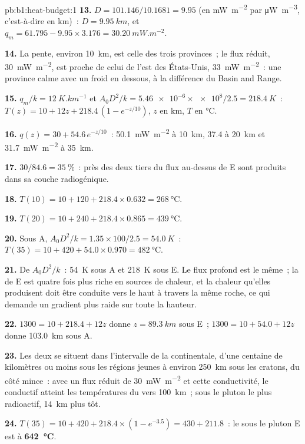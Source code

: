 \begin{solution}{pb:b1:heat-budget:1}
\textbf{13.} $D = 101.146/10.1681 = 9.95$ (en \unit{mW.m^{-2}} par
\unit{\micro W.m^{-3}}, c'est-à-dire en km)~: $D = \qty{9.95}{km}$, et $q_m = 61.795 -
9.95\times3.176 = \qty{30.20}{mW.m^{-2}}$.

\textbf{14.} La pente, environ \qty{10}{km}, est celle des trois provinces~; le
flux réduit, \qty{30}{mW.m^{-2}}, est proche de celui de l'est des États-Unis,
\qty{33}{mW.m^{-2}}~: une province calme avec un  froid en dessous, à la
différence du Basin and Range.

\textbf{15.} $q_m/k = \qty{12}{K.km^{-1}}$ et $A_0D^2/k = \num{5.46e-6}\times\num{e8}/2.5
= \qty{218.4}{K}$~: $T(z) = 10 + 12z + 218.4\,(1 - e^{-z/10})$, $z$ en km, $T$ en
\unit{\degreeCelsius}.

\textbf{16.} $q(z) = 30 + 54.6\,e^{-z/10}$~: \qty{50.1}{mW.m^{-2}} à \qty{10}{km},
\num{37.4} à \qty{20}{km} et \qty{31.7}{mW.m^{-2}} à \qty{35}{km}.

\textbf{17.} $30/84.6 = \qty{35}{\percent}$~: près des deux tiers du flux
au-dessus de E sont produits dans sa couche radiogénique.

\textbf{18.} $T(10) = 10 + 120 + 218.4\times0.632 = \qty{268}{\degreeCelsius}$.

\textbf{19.} $T(20) = 10 + 240 + 218.4\times0.865 = \qty{439}{\degreeCelsius}$.

\textbf{20.} Sous A, $A_0D^2/k = 1.35\times100/2.5 = \qty{54.0}{K}$~:
$T(35) = 10 + 420 + 54.0\times0.970 = \qty{482}{\degreeCelsius}$.

\textbf{21.} De $A_0D^2/k$~: \qty{54}{K} sous A et \qty{218}{K} sous E. Le flux
profond est le même~; la  de E est quatre fois plus riche en sources de chaleur, et la
chaleur qu'elles produisent doit être conduite vers le haut à travers la même roche, ce qui demande un
gradient plus raide sur toute la hauteur.

\textbf{22.} $1300 = 10 + 218.4 + 12z$ donne $z = \qty{89.3}{km}$ sous E~;
$1300 = 10 + 54.0 + 12z$ donne \qty{103.0}{km} sous A.

\textbf{23.} Les deux se situent dans l'intervalle de la  continentale,
d'une centaine de kilomètres ou moins sous les régions jeunes à environ \qty{250}{km} sous les
cratons, du côté mince~: avec un flux réduit de \qty{30}{mW.m^{-2}} et cette
conductivité, le  conductif atteint les températures du  vers
\qty{100}{km}~; sous le pluton le plus radioactif, \qty{14}{km} plus tôt.

\textbf{24.} $T(35) = 10 + 420 + 218.4\times(1 - e^{-3.5}) = 430 + 211.8$~: le
 sous le pluton E est à
\textbf{\qty[text-series-to-math=true]{642}{\degreeCelsius}}.
\end{solution}
